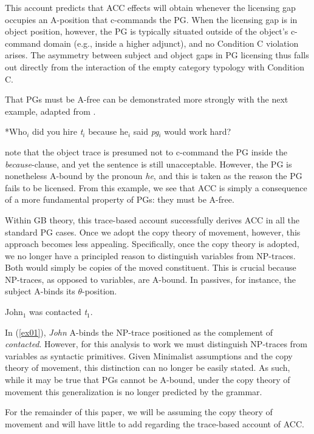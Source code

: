 \documentclass[12pt]{article}
\begin{document}
This account predicts that ACC effects will obtain whenever the licensing gap occupies an A-position that c-commands the PG. When the licensing gap is in object position, however, the PG is typically situated outside of the object's c-command domain (e.g., inside a higher adjunct), and no Condition C violation arises. The asymmetry between subject and object gaps in PG licensing thus falls out directly from the interaction of the empty category typology with Condition C.

That PGs must be A-free can be demonstrated more strongly with the next example, adapted from \citet{lasnik1988}.

\ex\label{ex09}{*Who$_i$ did you hire \textit{t}$_i$ because he$_i$ said \emph{pg}$_i$ would work hard?}
\xe

\noindent
\citet{lasnik1988} note that the object trace is presumed not to c-command the PG inside the \textit{because}-clause, and yet the sentence is still unacceptable. However, the PG is nonetheless A-bound by the pronoun \textit{he}, and this is taken as the reason the PG fails to be licensed. From this example, we see that ACC is simply a consequence of a more fundamental property of PGs: they must be A-free. 

Within GB theory, this trace-based account successfully derives ACC in all the standard PG cases. Once we adopt the copy theory of movement, however, this approach becomes less appealing. Specifically, once the copy theory is adopted, we no longer have a principled reason to distinguish variables from NP-traces. Both would simply be copies of the moved constituent. This is crucial because NP-traces, as opposed to variables, are A-bound. In passives, for instance, the subject A-binds its $\theta$-position.

\ex\label{ex01}{John$_1$ was contacted \textit{t}$_1$}.
\xe

In (\ref{ex01}), \textit{John} A-binds the NP-trace positioned as the complement of \textit{contacted}. However, for this analysis to work we must distinguish NP-traces from variables as syntactic primitives. Given Minimalist assumptions and the copy theory of movement, this distinction can no longer be easily stated. As such, while it may be true that PGs cannot be A-bound, under the copy theory of movement this generalization is no longer predicted by the grammar.

For the remainder of this paper, we will be assuming the copy theory of movement and will have little to add regarding the trace-based account of ACC. 
\end{document}
